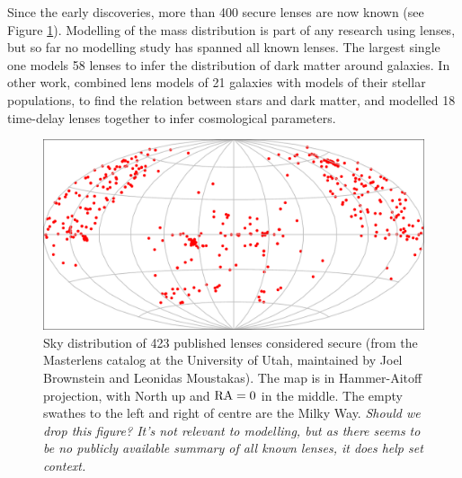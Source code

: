 Since the early discoveries, more than 400 secure lenses are now known
(see Figure \ref{fig:masterlens}).  Modelling of the mass distribution
is part of any research using lenses, but so far no modelling study
has spanned all known lenses.  The largest single one
\citep{2009ApJ...703L..51K} models 58 lenses to infer the distribution
of dark matter around galaxies.  In other work,
\cite{2011ApJ...740...97L} combined lens models of 21 galaxies with
models of their stellar populations, to find the relation between
stars and dark matter, and \cite{2014MNRAS.437..600S} modelled 18
time-delay lenses together to infer cosmological parameters.

\begin{figure}
\centering
\includegraphics[width=\hsize]{fig/lenssky}
\caption{Sky distribution of 423 published lenses considered secure
  (from the Masterlens catalog at the University of Utah, maintained
  by Joel Brownstein and Leonidas Moustakas).  The map is in
  Hammer-Aitoff projection, with North up and $\rm RA=0$ in the
  middle. The empty swathes to the left and right of centre are the
  Milky Way. {\em Should we drop this figure?  It's not relevant to
    modelling, but as there seems to be no publicly available summary
    of all known lenses, it does help set context.}}
\label{fig:masterlens}
\end{figure}

